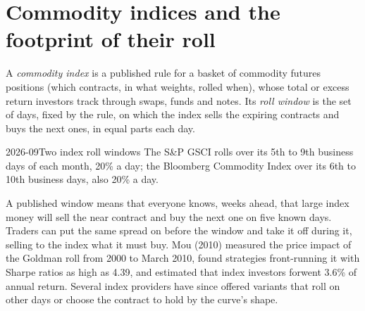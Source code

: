 \begin{omfigure}

\label{fig:m3:forward-curves-storage-and-convenience-yield:samuelson}
\end{omfigure}

\section{Commodity indices and the footprint of their roll}

\begin{definition}\label{def:m3:forward-curves-storage-and-convenience-yield:index}
A \emph{commodity index} is a published rule for a basket of commodity futures
positions (which contracts, in what weights, rolled when), whose total or excess return investors track
through swaps, funds and notes. Its \emph{roll window} is the set of days, fixed by
the rule, on which the index sells the expiring contracts and buys the next ones, in equal parts each
day.
\end{definition}

\begin{dated}{2026-09}{Two index roll windows}\label{dat:m3:forward-curves-storage-and-convenience-yield:windows}
The S\&P GSCI rolls over its 5th to 9th business days of each month, 20\% a day; the Bloomberg
Commodity Index over its 6th to 10th business days, also 20\% a day.
\end{dated}

A published window means that everyone knows, weeks ahead, that large index money will sell the near
contract and buy the next one on five known days. Traders can put the same spread on before the window
and take it off during it, selling to the index what it must buy. Mou (2010) measured the price impact
of the Goldman roll from 2000 to March 2010, found strategies front-running it with Sharpe ratios as high
as 4.39, and estimated that index investors forwent 3.6\% of annual return. Several index providers have
since offered variants that roll on other days or choose the contract to hold by the curve's shape.

